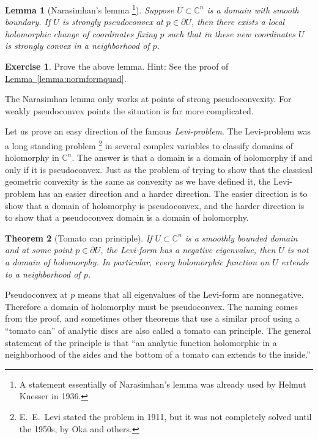 \documentclass[12pt,openany]{book}
\newcommand{\C}{{\mathbb{C}}}
\newcommand{\myindex}[1]{#1\index{#1}}
\theoremstyle{plain}
\newtheorem{thm}{Theorem}[section]
\newtheorem{lemma}[thm]{Lemma}
\theoremstyle{remark}
\theoremstyle{definition}
\newenvironment{exbox}{%
    \def\FrameCommand{\vrule width 1pt \relax\hspace {10pt}}%
    \MakeFramed {\advance \hsize -\width \FrameRestore }%
}{%
    \endMakeFramed
}
\theoremstyle{exercise}
\newtheorem{exercise}{Exercise}[section]
\theoremstyle{example}
\newcommand{\lemmaref}[1]{\hyperref[#1]{Lemma~\ref*{#1}}}
\begin{document}
\begin{lemma}[Narasimhan's lemma%
\footnote{A statement essentially of Narasimhan's lemma was already used by Helmut
Knesser in 1936.}]
Suppose $U \subset \C^n$ is a domain with smooth boundary.
If $U$ is strongly
pseudoconvex at $p \in \partial U$, then there exists a local holomorphic change of
coordinates fixing $p$ such that in these new coordinates $U$ is strongly convex in a neighborhood of $p$.
\end{lemma}

\begin{exbox}
\begin{exercise}
Prove the above lemma.  Hint: See the proof of \lemmaref{lemma:normformquad}.
\end{exercise}
\end{exbox}

The Narasimhan lemma only works at points of strong
pseudoconvexity.  For weakly pseudoconvex points the situation is far more
complicated.

\medskip


Let us prove an easy direction of the famous 
\emph{\myindex{Levi-problem}}.  The Levi-problem was a long standing
problem%
\footnote{E.\ E.\ Levi stated the problem in 1911, but it was not completely
solved until the 1950s, by Oka and others.}
in several complex variables to classify domains of holomorphy in
$\C^n$.  The answer is that a domain is a domain of holomorphy if and only
if it is pseudoconvex.  Just as the problem of trying to show that
the classical geometric convexity is the same as convexity as we have
defined it, 
the Levi-problem has an easier direction and a harder direction.
The easier direction is to show that a domain of holomorphy is pseudoconvex, and
the harder direction is to show that a pseudoconvex domain is a domain of
holomorphy.

\begin{thm}[Tomato can principle] \label{thm:tomatocan}
If $U \subset \C^n$ is a smoothly bounded domain and at some point $p \in
\partial U$, the Levi-form has a negative eigenvalue, then $U$ is not
a domain of holomorphy.  In particular, every holomorphic function on $U$
extends to a neighborhood of $p$.
\end{thm}

Pseudoconvex at $p$ means that all eigenvalues of the Levi-form are
nonnegative.
Therefore a domain of holomorphy must be pseudoconvex.
The naming comes from the proof, and sometimes other theorems that use a
similar proof using a ``tomato can'' of analytic discs are also called
a tomato can principle.
The general statement of the principle is that ``an
analytic function holomorphic in a neighborhood of the sides and the bottom
of a tomato can extends to the inside.''
\end{document}
